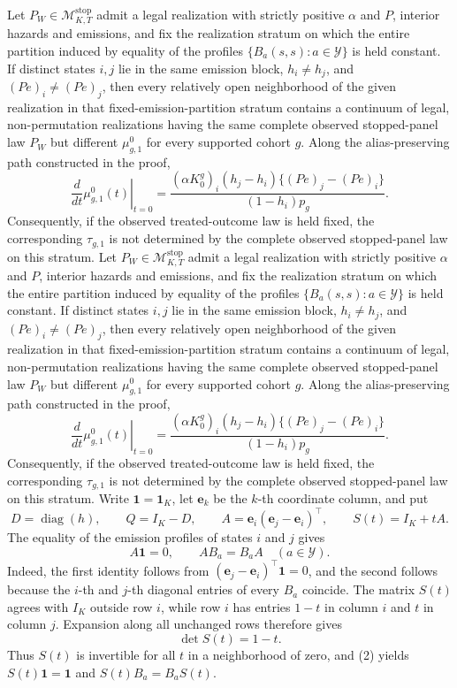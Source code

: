 Let \(P_W\in\mathcal M^{\mathrm{stop}}_{K,T}\) admit a legal realization with strictly positive \(\alpha\) and \(P\), interior hazards and emissions, and fix the realization stratum on which the entire partition induced by equality of the profiles \(\{B_a(s,s):a\in\mathcal Y\}\) is held constant. If distinct states \(i,j\) lie in the same emission block, \(h_i\ne h_j\), and \((Pe)_i\ne(Pe)_j\), then every relatively open neighborhood of the given realization in that fixed-emission-partition stratum contains a continuum of legal, non-permutation realizations having the same complete observed stopped-panel law \(P_W\) but different \(\mu^0_{g,1}\) for every supported cohort \(g\). Along the alias-preserving path constructed in the proof,
\[
 \left.\frac{d}{dt}\mu^0_{g,1}(t)\right|_{t=0}
 =\frac{(\alpha K_0^g)_i(h_j-h_i)\{(Pe)_j-(Pe)_i\}}{(1-h_i)p_g}.
\]
Consequently, if the observed treated-outcome law is held fixed, the corresponding \(\tau_{g,1}\) is not determined by the complete observed stopped-panel law on this stratum.
Let \(P_W\in\mathcal M^{\mathrm{stop}}_{K,T}\) admit a legal realization with strictly positive \(\alpha\) and \(P\), interior hazards and emissions, and fix the realization stratum on which the entire partition induced by equality of the profiles \(\{B_a(s,s):a\in\mathcal Y\}\) is held constant. If distinct states \(i,j\) lie in the same emission block, \(h_i\ne h_j\), and \((Pe)_i\ne(Pe)_j\), then every relatively open neighborhood of the given realization in that fixed-emission-partition stratum contains a continuum of legal, non-permutation realizations having the same complete observed stopped-panel law \(P_W\) but different \(\mu^0_{g,1}\) for every supported cohort \(g\). Along the alias-preserving path constructed in the proof,
\[
 \left.\frac{d}{dt}\mu^0_{g,1}(t)\right|_{t=0}
 =\frac{(\alpha K_0^g)_i(h_j-h_i)\{(Pe)_j-(Pe)_i\}}{(1-h_i)p_g}.
\]
Consequently, if the observed treated-outcome law is held fixed, the corresponding \(\tau_{g,1}\) is not determined by the complete observed stopped-panel law on this stratum.
Write \(\mathbf 1=\mathbf 1_K\), let \(\mathbf e_k\) be the \(k\)-th coordinate column, and put
\[
 D=\operatorname{diag}(h),\qquad Q=I_K-D,\qquad
 A=\mathbf e_i(\mathbf e_j-\mathbf e_i)^{\top},\qquad
 S(t)=I_K+tA.                                                   \tag{1}
\]
The equality of the emission profiles of states \(i\) and \(j\) gives
\[
 A\mathbf 1=0,\qquad AB_a=B_aA\quad(a\in\mathcal Y).         \tag{2}
\]
Indeed, the first identity follows from \((\mathbf e_j-\mathbf e_i)^{\top}\mathbf 1=0\), and the second follows because the \(i\)-th and \(j\)-th diagonal entries of every \(B_a\) coincide. The matrix \(S(t)\) agrees with \(I_K\) outside row \(i\), while row \(i\) has entries \(1-t\) in column \(i\) and \(t\) in column \(j\). Expansion along all unchanged rows therefore gives
\[
 \det S(t)=1-t.                                                 \tag{3}
\]
Thus \(S(t)\) is invertible for all \(t\) in a neighborhood of zero, and (2) yields \(S(t)\mathbf 1=\mathbf 1\) and \(S(t)B_a=B_aS(t)\).

